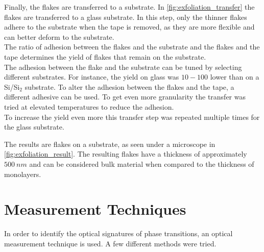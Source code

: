 \documentclass[
	twoside,
	parskip=half,
	a4paper,
]{scrbook}
\begin{document}
Finally, the flakes are transferred to a substrate.
In \autoref{fig:exfoliation_transfer} the flakes are transferred to a glass substrate.
In this step, only the thinner flakes adhere to the substrate when the tape is removed, as they are more flexible and can better deform to the substrate.\\
The ratio of adhesion between the flakes and the substrate and the flakes and the tape determines the yield of flakes that remain on the substrate.\\
The adhesion between the flake and the substrate can be tuned by selecting different substrates.
For instance, the yield on glass was $10-100$ lower than on a Si/Si$_2$ substrate.
To alter the adhesion between the flakes and the tape, a different adhesive can be used. 
To get even more granularity the transfer was tried at elevated temperatures to reduce the adhesion.\\
To increase the yield even more this transfer step was repeated multiple times for the glass substrate.

The results are flakes on a substrate, as seen under a microscope in \autoref{fig:exfoliation_result}.
The resulting flakes have a thickness of approximately $\SI{500}{nm}$ and can be considered bulk material when compared to the thickness of monolayers.


\clearpage
\section{Measurement Techniques}
In order to identify the optical signatures of phase transitions, an optical measurement technique is used.
A few different methods were tried.

\end{document}
